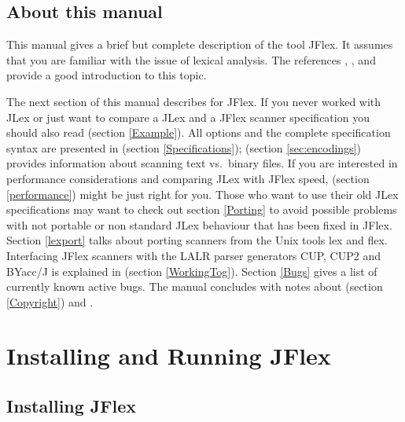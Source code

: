 \documentclass[11pt]{scrartcl}
\begin{document}
\subsection{About this manual}
This manual gives a brief but complete description of the tool JFlex. It
assumes that you are familiar with the issue of lexical analysis. The references \cite{Aho},
\cite{Appel}, and \cite{Maurer} provide a good introduction to this topic.

The next section of this manual describes  
for JFlex. If you never worked with JLex or
just want to compare a JLex and a JFlex scanner specification you
should also read  
(section \ref{Example}).  All options and the complete
specification syntax are presented in 
 (section \ref{Specifications});
 (section \ref{sec:encodings})
provides information about scanning text vs.~binary files.
If you are interested in performance
considerations and comparing JLex with JFlex speed, 
 (section \ref{performance})
might be just right for you. Those who want to
use their old JLex specifications may want to check out section \ref{Porting}
 to avoid possible problems
with not portable or non standard JLex behaviour that has been fixed in
JFlex. Section \ref{lexport} talks about porting scanners from the
Unix tools lex and flex.  Interfacing JFlex scanners with the LALR
parser generators CUP, CUP2 and BYacc/J is explained in  (section \ref{WorkingTog}).  Section \ref{Bugs}
 gives a list of currently known active bugs. 
The manual concludes with notes about 
 (section \ref{Copyright}) and
.


\section{Installing and Running JFlex}\label{Installing}

\subsection{Installing JFlex}
\end{document}
